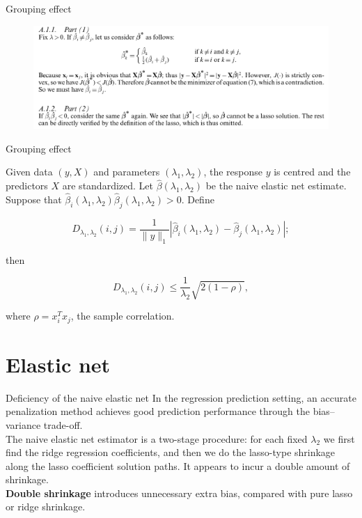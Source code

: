 \begin{frame}{Grouping effect}
    \begin{figure}
        \centering
        \includegraphics[width=1\textwidth]{img/image3.png}
    \end{figure}
\end{frame}

\begin{frame}{Grouping effect}
    \begin{theorem}[1]
        Given data \( (y, X) \) and parameters \( (\lambda_1, \lambda_2) \), the response \( y \) is centred and the predictors \( X \) are standardized. Let \( \hat{\beta}(\lambda_1, \lambda_2) \) be the naive elastic net estimate. Suppose that \( \hat{\beta}_i(\lambda_1, \lambda_2) \hat{\beta}_j(\lambda_1, \lambda_2) > 0 \). Define

$$
D_{\lambda_1,\lambda_2}(i, j) = \frac{1}{\lVert y \rVert_1} \left| \hat{\beta}_i(\lambda_1, \lambda_2) - \hat{\beta}_j(\lambda_1, \lambda_2) \right|;
$$

then

$$
D_{\lambda_1,\lambda_2}(i, j) \leq \frac{1}{\lambda_2} \sqrt{2(1 - \rho)},
$$

where \( \rho = x_i^T x_j \), the sample correlation.
    \end{theorem}
\end{frame}

\section{Elastic net}
    \begin{frame}{Deficiency of the naive elastic net}
    In the regression prediction setting, an accurate penalization method achieves good prediction performance through the bias–variance trade-off.\\ 
    \vspace{10pt}
    The naive elastic net estimator is a two-stage procedure: for each fixed $\lambda_2$ we first find the ridge regression coefficients, and then we do the lasso-type shrinkage along the lasso coefficient solution paths. It appears to incur a double amount of shrinkage. \\
    \vspace{10pt}
    \textbf{Double shrinkage} introduces unnecessary extra bias, compared with pure lasso or ridge shrinkage. 
    \end{frame}

